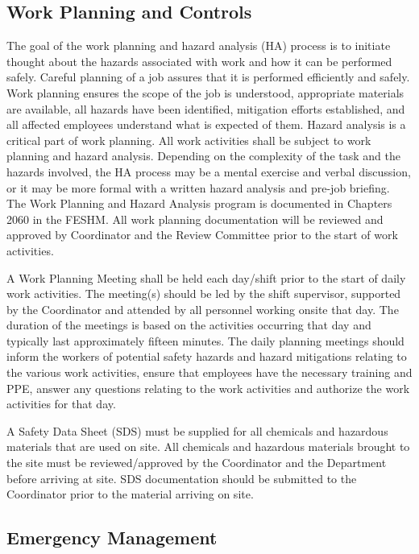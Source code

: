 \subsection{Work Planning and Controls}

The goal of the work planning and hazard analysis (HA) process is to
initiate thought about the hazards associated with work and how it can
be performed safely. Careful planning of a job assures that it is
performed efficiently and safely. Work planning ensures the scope of
the job is understood, appropriate materials are available, all
hazards have been identified, mitigation efforts established, and all
affected employees understand what is expected of them. Hazard
analysis is a critical part of work planning. All work activities
shall be subject to work planning and hazard analysis. Depending on
the complexity of the task and the hazards involved, the HA process
may be a mental exercise and verbal discussion, or it may be more
formal with a written hazard analysis and pre-job briefing. The Work
Planning and Hazard Analysis program is documented in Chapters 2060 in
the FESHM. All work planning documentation will be reviewed and
approved by   Coordinator and the 
 Review Committee prior to the start of work activities.

A Work Planning Meeting shall be held each day/shift prior to the
start of daily work activities. The meeting(s) should be led by the
shift supervisor, supported by the   Coordinator and
attended by all personnel working onsite that day. The duration of
the meetings is based on the activities occurring that day and
typically last approximately fifteen minutes. The daily planning
meetings should inform the workers of potential safety hazards and
hazard mitigations relating to the various work activities, ensure
that employees have the necessary  training and PPE, answer any
questions relating to the work activities and authorize the work
activities for that day.

A Safety Data Sheet (SDS) must be supplied for all chemicals and
hazardous materials that are used on site. All chemicals and hazardous
materials brought to the  site must be reviewed/approved by the
  Coordinator and the  
Department before arriving at site.  SDS documentation should be
submitted to the   Coordinator prior to the
material arriving on site.

\subsection{Emergency Management}

